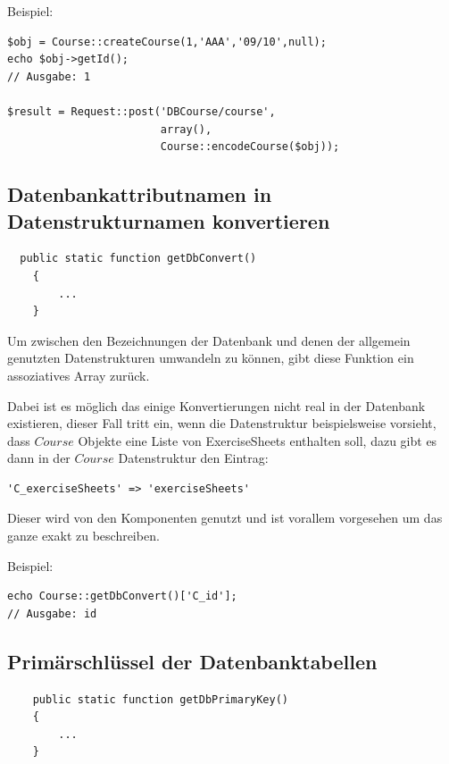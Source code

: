 \documentclass[10pt,a4paper,final,parskip]{scrartcl}
\begin{document}
\begin{minipage}{\textwidth}
Beispiel:
\begin{lstlisting}
$obj = Course::createCourse(1,'AAA','09/10',null);
echo $obj->getId();
// Ausgabe: 1

$result = Request::post('DBCourse/course',
                        array(),
                        Course::encodeCourse($obj));
\end{lstlisting}
\end{minipage}

\subsection{Datenbankattributnamen in Datenstrukturnamen konvertieren}
\begin{minipage}{\textwidth}
\begin{lstlisting}
  public static function getDbConvert()
    {
    	...
    }
\end{lstlisting}
\end{minipage}

Um zwischen den Bezeichnungen der Datenbank und denen der allgemein genutzten Datenstrukturen umwandeln zu können, gibt diese Funktion ein assoziatives Array zurück. 

Dabei ist es möglich das einige Konvertierungen nicht real in der Datenbank existieren, dieser Fall tritt ein, wenn die Datenstruktur beispielsweise vorsieht, dass $Course$ Objekte eine Liste von ExerciseSheets enthalten soll, dazu gibt es dann in der $Course$ Datenstruktur den Eintrag:
 
\begin{minipage}{\textwidth}
\begin{lstlisting}
'C_exerciseSheets' => 'exerciseSheets'
\end{lstlisting}
\end{minipage}

Dieser wird von den Komponenten genutzt und ist vorallem vorgesehen um das ganze exakt zu beschreiben.

\begin{minipage}{\textwidth}
Beispiel:
\begin{lstlisting}
echo Course::getDbConvert()['C_id'];
// Ausgabe: id
\end{lstlisting}
\end{minipage}

\subsection{Primärschlüssel der Datenbanktabellen}
\begin{minipage}{\textwidth}
\begin{lstlisting}
    public static function getDbPrimaryKey()
    {
    	...
    }
\end{lstlisting}
\end{minipage}
\end{document}
